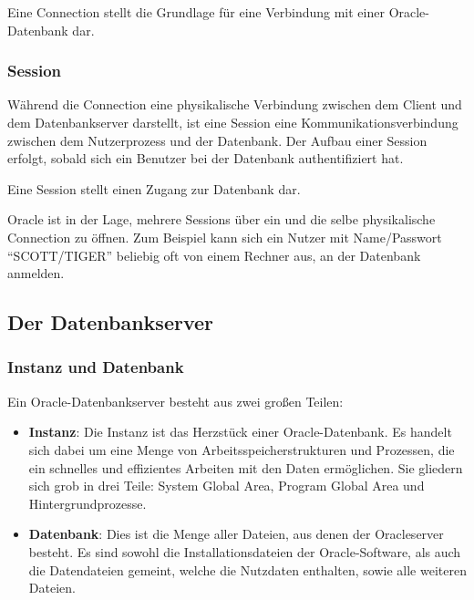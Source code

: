           \begin{merke}
            Eine Connection stellt die Grundlage für eine Verbindung mit einer Oracle-Datenbank dar.
          \end{merke}
        \subsubsection{Session}
          Während die Connection eine physikalische Verbindung zwischen dem Client und dem Datenbankserver darstellt, ist eine Session eine Kommunikationsverbindung zwischen dem Nutzerprozess und der Datenbank. Der Aufbau einer Session erfolgt, sobald sich ein Benutzer bei der Datenbank authentifiziert hat.

          \begin{merke}
            Eine Session stellt einen Zugang zur Datenbank dar.
          \end{merke}

          Oracle ist in der Lage, mehrere Sessions über ein und die selbe physikalische Connection zu öffnen. Zum Beispiel kann sich ein Nutzer mit Name/Passwort \enquote{SCOTT/TIGER} beliebig oft von einem Rechner aus, an der Datenbank anmelden.


      \subsection{Der Datenbankserver}
        \subsubsection{Instanz und Datenbank}
          Ein Oracle-Datenbankserver besteht aus zwei großen Teilen:
          \begin{itemize}
            \item \textbf{Instanz}: Die Instanz ist das Herzstück einer Oracle-Datenbank. Es handelt sich dabei um eine Menge von Arbeitsspeicherstrukturen und Prozessen, die ein schnelles und effizientes Arbeiten mit den Daten ermöglichen. Sie gliedern sich grob in drei Teile: System Global Area, Program Global Area und Hintergrundprozesse.
            \item \textbf{Datenbank}: Dies ist die Menge aller Dateien, aus denen der Oracleserver besteht. Es sind sowohl die Installationsdateien der Oracle-Software, als auch die Datendateien gemeint, welche die Nutzdaten enthalten, sowie alle weiteren Dateien.
          \end{itemize}

